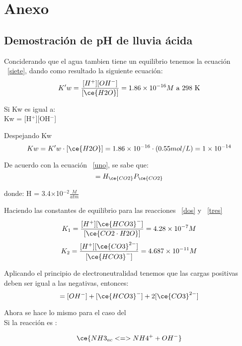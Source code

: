 \chapter*{Anexo}

\section {Demostraci\'on de pH de lluvia \'acida}


Conciderando que el agua tambien tiene un equilibrio tenemos la ecuaci\'on ~\ref{siete}, dando como resultado la siguiente ecuaci\'on:
\begin{equation*}
K' w =\frac{ [H^+][OH^-]} {[\ce{H2O}]} = 1.86\times10^{-16} M\textrm{     a 298 K}
\end{equation*}

Si Kw es igual a:\\
Kw = [H$^+$][OH$^-$]


Despejando Kw
\begin{equation*}
Kw = K'w\cdot[\ce{H2O}] = 1.86 \times10^{-16}\cdot(0.55mol/L) = 1\times10^{-14}
\end{equation*}


De acuerdo con la ecuaci\'on ~\ref{uno}, se sabe que:
\begin{equation*}
[\ce{CO2 \cdot H2O}] = H_{\ce{CO2}} P_{\ce{CO2}}  
\end{equation*}


donde: H = 3.4$\times$10$^{-2}$$\frac{M}{atm}$


Haciendo las constantes de equilibrio para las reacciones ~\ref{dos} y ~\ref{tres}
\begin{equation*}
K_1 = \frac{[H^+][\ce{HCO3}^-]} {[\ce{CO2\cdot H2O}]} = 4.28\times10^{-7} M
\end{equation*}
\begin{equation*}
K_2 =\frac{[H^+][\ce{CO3}^{2-}]} { [\ce{HCO3}^-]} = 4.687\times10^{-11} M
\end{equation*}


Aplicando el principio de electroneutralidad tenemos que las cargas positivas deben ser igual a las negativas, entonces:
\begin{equation*}
[H^+] = [OH^-]+[\ce{HCO3}^-] +2[\ce{CO3}^{2-}]
\end{equation*}


Ahora se hace lo mismo para el caso del \\
Si la reacci\'on es :

$$\ce{NH3_{ac} <=> NH4^+ + OH^-}$$

